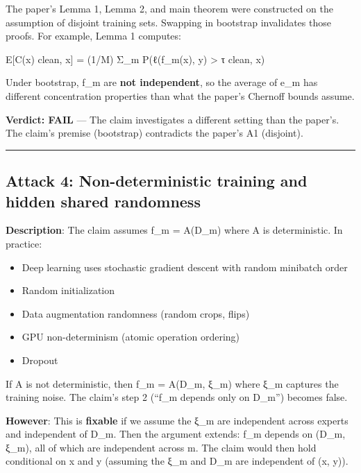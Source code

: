 \documentclass[
  12pt,
]{ctexart}
\providecommand{\tightlist}{%
  \setlength{\itemsep}{0pt}\setlength{\parskip}{0pt}}
\begin{document}
The paper's Lemma 1, Lemma 2, and main theorem were constructed on the
assumption of disjoint training sets. Swapping in bootstrap invalidates
those proofs. For example, Lemma 1 computes:

E{[}C(x) \textbar{} clean, x{]} = (1/M) Σ\_m P(ℓ(f\_m(x), y)
\textgreater{} τ \textbar{} clean, x)

Under bootstrap, f\_m are \textbf{not independent}, so the average of
e\_m has different concentration properties than what the paper's
Chernoff bounds assume.

\textbf{Verdict: FAIL} --- The claim investigates a different setting
than the paper's. The claim's premise (bootstrap) contradicts the
paper's A1 (disjoint).

\begin{center}\rule{0.5\linewidth}{0.5pt}\end{center}

\subsection{Attack 4: Non-deterministic training and hidden shared
randomness}\label{attack-4-non-deterministic-training-and-hidden-shared-randomness}

\textbf{Description}: The claim assumes f\_m = A(D\_m) where A is
deterministic. In practice:

\begin{itemize}
\tightlist
\item
  Deep learning uses stochastic gradient descent with random minibatch
  order
\item
  Random initialization
\item
  Data augmentation randomness (random crops, flips)
\item
  GPU non-determinism (atomic operation ordering)
\item
  Dropout
\end{itemize}

If A is not deterministic, then f\_m = A(D\_m, ξ\_m) where ξ\_m captures
the training noise. The claim's step 2 (``f\_m depends only on D\_m'')
becomes false.

\textbf{However}: This is \textbf{fixable} if we assume the ξ\_m are
independent across experts and independent of D\_m. Then the argument
extends: f\_m depends on (D\_m, ξ\_m), all of which are independent
across m. The claim would then hold conditional on x and y (assuming the
ξ\_m and D\_m are independent of (x, y)).
\end{document}
